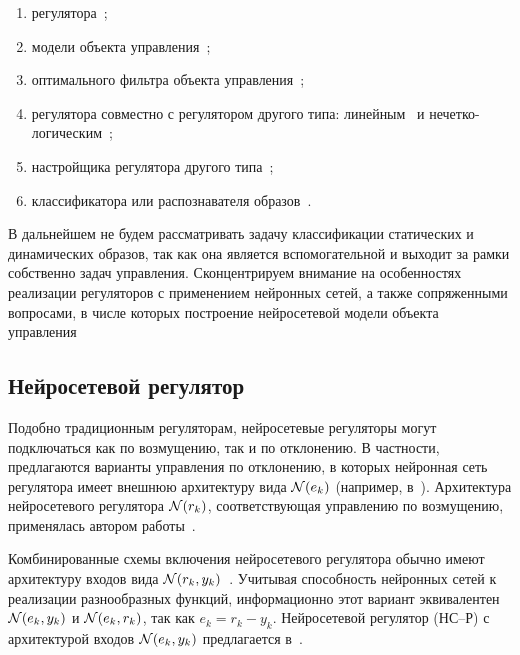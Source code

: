 \begin{enumerate}

\item
регулятора~\cite{sigom00,khomyu96,kav96,bouchard01,linwaihong01,gorfeld96,tukin01,pican95,golovko01,fabri98};

\item
модели объекта управления~\cite{narmuk96,park96,levinar95,kulee96};

\item
оптимального фильтра объекта управления~\cite{hayyeeder97};

\item
регулятора совместно с регулятором другого типа:
линейным~\cite{steck96,sigom00,chenmills97} и
нечетко-логическим~\cite{sigom00,wailinlin00,linwaihong01};

\item
настройщика регулятора другого типа~\cite{sigom00,samtar96};

\item
классификатора или распознавателя
образов~\cite{uhrig91,zhuchkov02,basubart94,golovko01}.

\end{enumerate}

В дальнейшем не будем рассматривать задачу классификации статических и
динамических образов, так как она является вспомогательной и выходит
за рамки собственно задач управления.  Сконцентрируем внимание на
особенностях реализации регуляторов с применением нейронных сетей, а
также сопряженными вопросами, в числе которых построение нейросетевой
модели объекта управления

\subsection{Нейросетевой регулятор}


Подобно традиционным регуляторам, нейросетевые регуляторы могут
подключаться как по возмущению, так и по отклонению.  В частности,
предлагаются варианты управления по отклонению, в которых нейронная
сеть регулятора имеет внешнюю архитектуру вида $\mathcal{N}(e_k)$ (например,
в~\cite{ronco98}).
Архитектура нейросетевого регулятора $\mathcal{N}(r_k)$, соответствующая
управлению по возмущению, применялась автором работы~\cite{khomyu96}.

Комбинированные схемы включения нейросетевого регулятора обычно имеют
архитектуру входов вида
$\mathcal{N}(r_k,y_k)$~\cite{narpart92,trc95,samtar96}.  Учитывая
способность нейронных сетей к реализации разнообразных функций,
информационно этот вариант эквивалентен $\mathcal{N}(e_k,y_k)$ и
$\mathcal{N}(e_k,r_k)$, так как $e_k=r_k-y_k$.  Нейросетевой регулятор (НС--Р)
с архитектурой входов $\mathcal{N}(e_k,y_k)$ предлагается в~\cite{narmuk96}.

